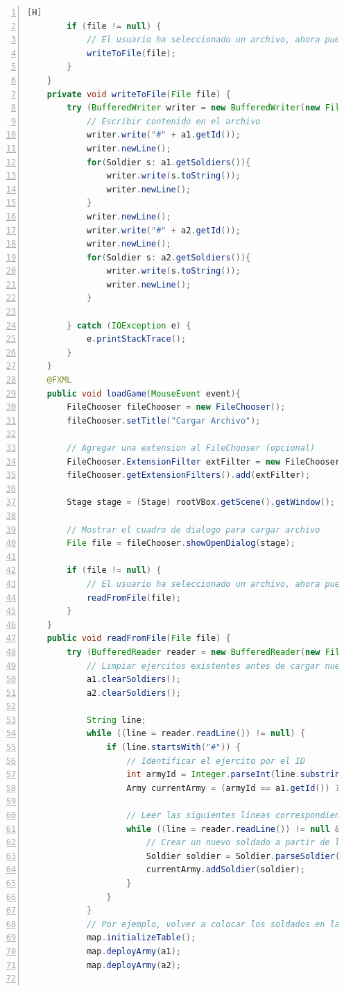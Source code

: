 \documentclass{article}
\begin{document}
\begin{lstlisting}[language=java,caption={Clase controladora}, numbers=left][H]
        if (file != null) {
            // El usuario ha seleccionado un archivo, ahora puedes escribir en el
            writeToFile(file);
        }
    }
    private void writeToFile(File file) {
        try (BufferedWriter writer = new BufferedWriter(new FileWriter(file))) {
            // Escribir contenido en el archivo
            writer.write("#" + a1.getId());
            writer.newLine();
            for(Soldier s: a1.getSoldiers()){
                writer.write(s.toString());
                writer.newLine();
            }
            writer.newLine();
            writer.write("#" + a2.getId());
            writer.newLine();
            for(Soldier s: a2.getSoldiers()){
                writer.write(s.toString());
                writer.newLine();
            }

        } catch (IOException e) {
            e.printStackTrace();
        }
    }
    @FXML
    public void loadGame(MouseEvent event){
        FileChooser fileChooser = new FileChooser();
        fileChooser.setTitle("Cargar Archivo");

        // Agregar una extension al FileChooser (opcional)
        FileChooser.ExtensionFilter extFilter = new FileChooser.ExtensionFilter("Archivos de Texto (*.txt)", "*.txt");
        fileChooser.getExtensionFilters().add(extFilter);

        Stage stage = (Stage) rootVBox.getScene().getWindow();

        // Mostrar el cuadro de dialogo para cargar archivo
        File file = fileChooser.showOpenDialog(stage);

        if (file != null) {
            // El usuario ha seleccionado un archivo, ahora puedes leer de el
            readFromFile(file);
        }
    }
    public void readFromFile(File file) {
        try (BufferedReader reader = new BufferedReader(new FileReader(file))) {
            // Limpiar ejercitos existentes antes de cargar nuevos datos
            a1.clearSoldiers();
            a2.clearSoldiers();

            String line;
            while ((line = reader.readLine()) != null) {
                if (line.startsWith("#")) {
                    // Identificar el ejercito por el ID
                    int armyId = Integer.parseInt(line.substring(1));
                    Army currentArmy = (armyId == a1.getId()) ? a1 : a2;

                    // Leer las siguientes lineas correspondientes a los soldados
                    while ((line = reader.readLine()) != null && (!line.startsWith("#") && !line.trim().isEmpty())) {
                        // Crear un nuevo soldado a partir de la linea y agregarlo al ejercito
                        Soldier soldier = Soldier.parseSoldier(line);
                        currentArmy.addSoldier(soldier);
                    }
                }
            }
            // Por ejemplo, volver a colocar los soldados en la interfaz grafica
            map.initializeTable();
            map.deployArmy(a1);
            map.deployArmy(a2);


\end{lstlisting}
\end{document}
